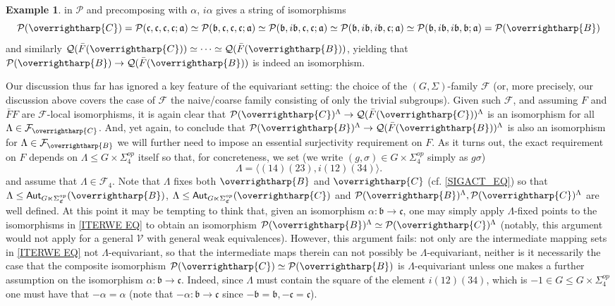 \documentclass[a4paper,10pt
,draft
]{article}%
\numberwithin{equation}{section}
\numberwithin{figure}{section}
\theoremstyle{definition} %
\newtheorem{example}[equation]{Example}%
\newcommand{\vect}[1]{\text{\overrightharp{\ensuremath{#1}}}}
\newcommand{\F}{\ensuremath{\mathcal F}}
\newcommand{\V}{\ensuremath{\mathcal V}}
\renewcommand{\P}{\ensuremath{\mathcal P}}
\newcommand{\1}{\ensuremath{\mathbbm 1}}%
\begin{document}
\begin{example}
in $\P$ and precomposing  
with $\alpha$, $i \alpha$ gives a string of isomorphisms
\begin{equation}\label{ITERWE EQ}
\P(\vect{C})
=
\P(\mathfrak{c},\mathfrak{c},\mathfrak{c},\mathfrak{c};\mathfrak{a})
\simeq 
\P(\mathfrak{b},\mathfrak{c},\mathfrak{c},\mathfrak{c};\mathfrak{a})
\simeq
\P(\mathfrak{b},i\mathfrak{b},\mathfrak{c},\mathfrak{c};\mathfrak{a})
\simeq
\P(\mathfrak{b},i\mathfrak{b},i\mathfrak{b},\mathfrak{c};\mathfrak{a})
\simeq
\P(\mathfrak{b},i\mathfrak{b},i\mathfrak{b},\mathfrak{b};\mathfrak{a})
=
\P(\vect{B})
\end{equation}
and similarly
$\mathcal{Q}(\bar{F}(\vect{C})) 
\simeq
\cdots 
\simeq
\mathcal{Q}(\bar{F}(\vect{B}))
$,
yielding that
$\P(\vect{B}) \to \mathcal{Q}(\bar{F}(\vect{B}))$
is indeed an isomorphism.

Our discussion thus far has ignored a key feature of the equivariant setting: the choice of the $(G,\Sigma)$-family $\F$
(or, more precisely, our discussion above covers the case of $\F$ the naive/coarse family consisting of only the trivial subgroups).
Given such $\F$, 
and assuming $F$ and $\bar{F} F$ are $\F$-local isomorphisms,
it is again clear that
$\P(\vect{C})^{\Lambda} \to \mathcal{Q}(\bar{F}(\vect{C}))^{\Lambda}$
is an isomorphism for all $\Lambda \in \F_{\vect{C}}$.
And, yet again, to conclude that
$\P(\vect{B})^{\Lambda} \to \mathcal{Q}(\bar{F}(\vect{B}))^{\Lambda}$
is also an isomorphism for $\Lambda \in \F_{\vect{B}}$ we will further need to impose an essential surjectivity requirement on $F$.
As it turns out, the exact requirement on $F$ depends on 
$\Lambda \leq G \times \Sigma_4^{op}$ itself so that, for concreteness, we set (we write $(g,\sigma) \in G \times \Sigma_4^{op}$ simply as $g\sigma$)
\[
\Lambda = \langle (14)(23), i (12)(34) \rangle.
\]
and assume that $\Lambda \in \F_4$.
Note that $\Lambda$ fixes both 
$\vect{B}$ and $\vect{C}$
(cf. \eqref{SIGACT_EQ})
so that 
$\Lambda \leq \mathsf{Aut}_{G \ltimes \Sigma^{op}_{\mathfrak{C}}}(\vect{B})$,
$\Lambda \leq \mathsf{Aut}_{G \ltimes \Sigma^{op}_{\mathfrak{C}}}(\vect{C})$
and $\P(\vect{B})^{\Lambda}, \P(\vect{C})^{\Lambda}$
are well defined.
At this point it may be tempting to think that, 
given an isomorphism 
$\alpha \colon \mathfrak{b} \to \mathfrak{c}$,
one may simply apply $\Lambda$-fixed points 
to the isomorphisms in \eqref{ITERWE EQ}
to obtain an isomorphism 
$\P(\vect{B})^{\Lambda} \simeq \P(\vect{C})^{\Lambda}$
(notably, this argument would not apply for a general $\V$
with general weak equivalences).
%
However, this argument fails: not only are the intermediate mapping sets
in \eqref{ITERWE EQ} not $\Lambda$-equivariant, so that the intermediate maps therein can not possibly be $\Lambda$-equivariant,
neither is it necessarily the case that the composite isomorphism
$\P(\vect{C}) \simeq \P(\vect{B})$ is $\Lambda$-equivariant
unless one makes a further assumption on the isomorphism
$\alpha\colon \mathfrak{b} \to \mathfrak{c}$.
Indeed, since $\Lambda$
must contain the square of the element $i(12)(34)$,
which is $-1 \in G \leq G \times \Sigma_4^{op}$
one must have that 
$-\alpha =\alpha$
(note that $-\alpha \colon \mathfrak{b} \to \mathfrak{c}$
since $-\mathfrak{b}=\mathfrak{b},-\mathfrak{c}=\mathfrak{c}$).


\end{example}
\end{document}
